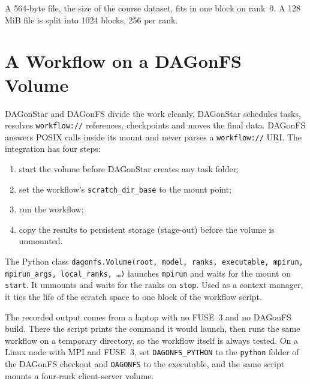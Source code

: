 A 564-byte file, the size of the course dataset, fits in one block on rank~0.
A 128\,MiB file is split into 1024 blocks, 256 per rank.

\section{A Workflow on a DAGonFS Volume}

DAGonStar and DAGonFS divide the work cleanly. DAGonStar schedules tasks,
resolves \texttt{workflow://} references, checkpoints and moves the final
data. DAGonFS answers POSIX calls inside its mount and never parses a
\texttt{workflow://} URI. The integration has four steps:
\begin{enumerate}[leftmargin=1.6em]
  \item start the volume before DAGonStar creates any task folder;
  \item set the workflow's \texttt{scratch\_dir\_base} to the mount point;
  \item run the workflow;
  \item copy the results to persistent storage (stage-out) before the volume
    is unmounted.
\end{enumerate}

The Python class \texttt{dagonfs.Volume(root, model, ranks, executable,
mpirun, mpirun\_args, local\_ranks, \ldots)} launches \texttt{mpirun} and
waits for the mount on \texttt{start}. It unmounts and waits for the ranks on
\texttt{stop}. Used as a context manager, it ties the life of the scratch
space to one block of the workflow script.





The recorded output comes from a laptop with no FUSE~3 and no DAGonFS build.
There the script prints the command it would launch, then runs the same
workflow on a temporary directory, so the workflow itself is always tested.
On a Linux node with MPI and FUSE~3, set \texttt{DAGONFS\_PYTHON} to the
\texttt{python} folder of the DAGonFS checkout and \texttt{DAGONFS} to the
executable, and the same script mounts a four-rank client-server volume.

